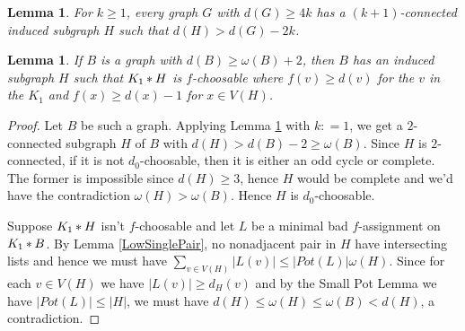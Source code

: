 \documentclass[12pt]{article}
\theoremstyle{plain}
\newtheorem{lem}[thm]{Lemma}
\theoremstyle{definition}
\theoremstyle{remark}
\newcommand{\card}[1]{\left|#1\right|}
\newcommand{\join}[2]{#1 \mbox{\hspace{2 pt}$\ast$\hspace{2 pt}} #2}
\newcommand{\DefinedAs}{\mathrel{\mathop:}=}
\begin{document}
\begin{lem}\label{MaderLemma}
For $k \geq 1$, every graph $G$ with $d(G) \geq 4k$ has a $(k+1)$-connected induced subgraph $H$ such that $d(H) > d(G) - 2k$.
\end{lem}

\begin{lem}\label{LowVertexHighAverageDegree}
If $B$ is a graph with $d(B) \geq \omega(B) + 2$, then $B$ has an induced subgraph $H$ such that $\join{K_1}{H}$ is $f$-choosable where $f(v) \geq d(v)$ for the $v$ in the $K_1$ and $f(x) \geq d(x) - 1$ for $x \in V(H)$.
\end{lem}
\begin{proof}
Let $B$ be such a graph.  Applying Lemma \ref{MaderLemma} with $k \DefinedAs 1$, we get a $2$-connected subgraph $H$ of $B$ with $d(H) > d(B) - 2 \geq \omega(B)$.  Since $H$ is $2$-connected, if it is not $d_0$-choosable, then it is either an odd cycle or complete.  The former is impossible since $d(H) \geq 3$, hence $H$ would be complete and we'd have the contradiction $\omega(H) > \omega(B)$.  Hence $H$ is $d_0$-choosable.  

Suppose $\join{K_1}{H}$ isn't $f$-choosable and let $L$ be a minimal bad $f$-assignment on $\join{K_1}{B}$.  
By Lemma \ref{LowSinglePair}, no nonadjacent pair in $H$ have intersecting lists and hence we must have $\sum_{v \in V(H)} \card{L(v)} \leq \card{Pot(L)}\omega(H)$.  Since for each $v \in V(H)$ we have $\card{L(v)} \geq d_H(v)$ and by the Small Pot Lemma we have $\card{Pot(L)} \leq \card{H}$, we must have $d(H) \leq \omega(H) \leq \omega(B) < d(H)$, a contradiction.
\end{proof}
\end{document}
